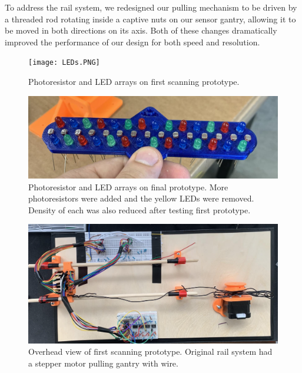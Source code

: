 \documentclass[12pt]{article}
\begin{document}
\begin{multicols*}{2}
            To address the rail system, we redesigned our pulling mechanism to be driven by a threaded rod rotating inside a captive nuts on our sensor gantry, allowing it to be moved in both directions on its axis. Both of these changes dramatically improved the performance of our design for both speed and resolution.

            \begin{figure}[H]
                \centering\texttt{[image: LEDs.PNG]}
                \captionsetup{width=\linewidth}
                \caption{Photoresistor and LED arrays on first scanning prototype.}
                \label{fig:LEDs}
            \end{figure}

            \begin{figure}[H]
                \centering\includegraphics[width=\linewidth]{ScannerV2.png}
                \captionsetup{width=\linewidth}
                \caption{Photoresistor and LED arrays on final prototype. More photoresistors were added and the yellow LEDs were removed. Density of each was also reduced after testing first prototype.}
                \label{fig:LED0sV2}
            \end{figure}

            \begin{figure}[H]
                \centering\includegraphics[width=\linewidth]{BirdsEye.PNG}
                \captionsetup{width=\linewidth}
                \caption{Overhead view of first scanning prototype. Original rail system had a stepper motor pulling gantry with wire.}
                \label{fig:Overhead}
            \end{figure}


\end{multicols*}
\end{document}
